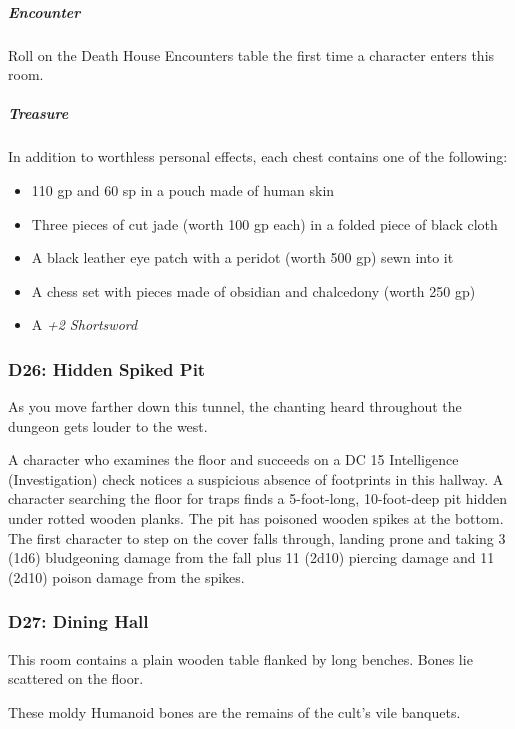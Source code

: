 \documentclass[10pt,a4paper,twoside,bg=print,twocolumn,openany,nodeprecatedcode]{dndbook}
\begin{document}
\subparagraph{Encounter}
Roll on the Death House Encounters table the first time a character enters this room.

\subparagraph{Treasure}
In addition to worthless personal effects, each chest contains one of the following:


\begin{itemize}
\item 110 gp and 60 sp in a pouch made of human skin
\item Three pieces of cut jade (worth 100 gp each) in a folded piece of black cloth
\item A black leather eye patch with a peridot (worth 500 gp) sewn into it
\item A chess set with pieces made of obsidian and chalcedony (worth 250 gp)
\item A \textit{+2 Shortsword}
\end{itemize}

\subsubsection{D26: Hidden Spiked Pit}
\begin{DndReadAloud}{}
As you move farther down this tunnel, the chanting heard throughout the dungeon gets louder to the west.

\end{DndReadAloud}

A character who examines the floor and succeeds on a DC 15 Intelligence (Investigation) check notices a suspicious absence of footprints in this hallway. A character searching the floor for traps finds a 5-foot-long, 10-foot-deep pit hidden under rotted wooden planks. The pit has poisoned wooden spikes at the bottom. The first character to step on the cover falls through, landing prone and taking 3 (1d6) bludgeoning damage from the fall plus 11 (2d10) piercing damage and 11 (2d10) poison damage from the spikes.

\subsubsection{D27: Dining Hall}
\begin{DndReadAloud}{}
This room contains a plain wooden table flanked by long benches. Bones lie scattered on the floor.

\end{DndReadAloud}

These moldy Humanoid bones are the remains of the cult's vile banquets.
\end{document}
